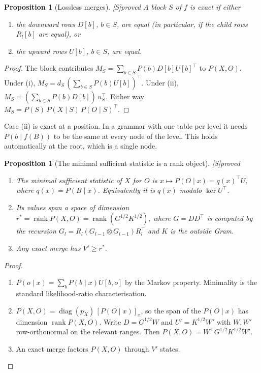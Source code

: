 \documentclass[11pt]{article}
\newtheorem{proposition}[theorem]{Proposition}
\theoremstyle{definition}
\theoremstyle{remark}
\newcommand{\src}[1]{\textsf{\small[#1]}}
\newcommand{\st}[1]{\textsf{\small\color{gray}#1}}
\begin{document}
\begin{proposition}[Lossless merges]\label{prop:o2a}\src{S}\st{proved}
A block $S$ of $f$ is exact if either
\begin{enumerate}
  \item[(i)] the downward rows $D[b]$, $b\in S$, are equal (in particular, if the child rows $R_l[b]$ are equal), or
  \item[(ii)] the upward rows $U[b]$, $b\in S$, are equal.
\end{enumerate}
\end{proposition}
\begin{proof}
The block contributes $M_S=\sum_{b\in S}P(b)D[b]U[b]^{\top}$ to $P(X,O)$. Under (i), $M_S=d_S\,(\sum_{b\in S} P(b)U[b])^{\top}$. Under (ii), $M_S=(\sum_{b\in S}P(b)D[b])\,u_S^{\top}$. Either way $M_S=P(S)\,P(X\mid S)\,P(O\mid S)^{\top}$.
\end{proof}

\noindent Case (ii) is exact at a position. In a grammar with one table per level it needs $P(b\mid f(B))$ to be the same at every node of the level. This holds automatically at the root, which is a single node.

\begin{proposition}[The minimal sufficient statistic is a rank object]\label{prop:o2b}\src{S}\st{proved}
\begin{enumerate}
  \item The minimal sufficient statistic of $X$ for $O$ is $x\mapsto P(O\mid x)=q(x)^{\top}U$, where $q(x)=P(B\mid x)$. Equivalently it is $q(x)$ modulo $\ker U^{\top}$.
  \item Its values span a space of dimension $r^*=\operatorname{rank}P(X,O)=\operatorname{rank}(G^{1/2}K^{1/2})$, where $G=DD^{\top}$ is computed by the recursion $G_l=R_l(G_{l-1}\otimes G_{l-1})R_l^{\top}$ and $K$ is the outside Gram.
  \item Any exact merge has $V'\ge r^*$.
\end{enumerate}
\end{proposition}
\begin{proof}
\begin{enumerate}
  \item $P(o\mid x)=\sum_b P(b\mid x)U[b,o]$ by the Markov property. Minimality is the standard likelihood-ratio characterisation.
  \item $P(X,O)=\operatorname{diag}(p_X)\,[P(O\mid x)]_x$, so the span of the $P(O\mid x)$ has dimension $\operatorname{rank}P(X,O)$. Write $D=G^{1/2}W$ and $U'=K^{1/2}W'$ with $W,W'$ row-orthonormal on the relevant ranges. Then $P(X,O)=W^{\top}G^{1/2}K^{1/2}W'$.
  \item An exact merge factors $P(X,O)$ through $V'$ states.
\end{enumerate}
\end{proof}
\end{document}
